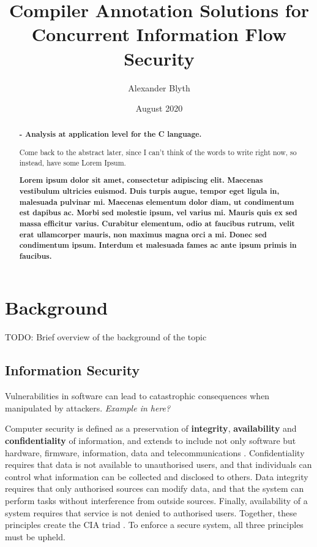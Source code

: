 \documentclass[twocolumn]{article}
\title{Compiler Annotation Solutions for Concurrent Information Flow Security}
\author{Alexander Blyth}
\date{August 2020}
\begin{document}
\maketitle


\begin{abstract}
    \textbf{- Analysis at application level for the C language.}

    Come back to the abstract later, since I can't think of the words to write right now, so instead, have some Lorem Ipsum.

    \textbf{Lorem ipsum dolor sit amet, consectetur adipiscing elit. Maecenas vestibulum ultricies euismod. Duis turpis augue, tempor eget ligula in, malesuada pulvinar mi. Maecenas elementum dolor diam, ut condimentum est dapibus ac. Morbi sed molestie ipsum, vel varius mi. Mauris quis ex sed massa efficitur varius. Curabitur elementum, odio at faucibus rutrum, velit erat ullamcorper mauris, non maximus magna orci a mi. Donec sed condimentum ipsum. Interdum et malesuada fames ac ante ipsum primis in faucibus.}
\end{abstract}

\section{Background}
TODO: Brief overview of the background of the topic

\subsection{Information Security}
Vulnerabilities in software can lead to catastrophic consequences when manipulated by attackers. \textit{Example in here?}

Computer security is defined as a preservation of \textbf{integrity}, \textbf{availability} and \textbf{confidentiality} of information, and extends to include not only software but hardware, firmware, information, data and telecommunications \cite{guttman1995introduction}.
Confidentiality requires that data is not available to unauthorised users, and that individuals can control what information can be collected and disclosed to others. Data integrity requires that only authorised sources can modify data, and that the system can perform tasks without interference from outside sources. Finally, availability of a system requires that service is not denied to authorised users. Together, these principles create the CIA triad \cite{stallings2012computer}. To enforce a secure system, all three principles must be upheld.
\end{document}
